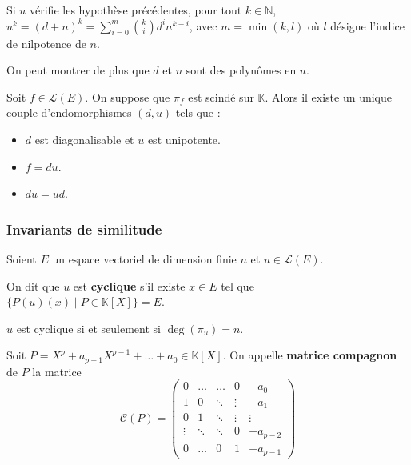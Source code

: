   \begin{corollary}
    Si $u$ vérifie les hypothèse précédentes, pour tout $k \in \mathbb{N}$, $u^k = (d + n)^k = \sum_{i=0}^m \binom{k}{i} d^i n^{k-i}$, avec $m = \min(k, l)$ où $l$ désigne l'indice de nilpotence de $n$.
  \end{corollary}

  \begin{remark}
    On peut montrer de plus que $d$ et $n$ sont des polynômes en $u$.
  \end{remark}


  \begin{theorem}
    Soit $f \in \mathcal{L}(E)$. On suppose que $\pi_f$ est scindé sur $\mathbb{K}$. Alors il existe un unique couple d'endomorphismes $(d, u)$ tels que :
    \begin{itemize}
      \item $d$ est diagonalisable et $u$ est unipotente.
      \item $f = du$.
      \item $du = ud$.
    \end{itemize}
  \end{theorem}

  \subsubsection{Invariants de similitude}


  Soient $E$ un espace vectoriel de dimension finie $n$ et $u \in \mathcal{L}(E)$.

  \begin{definition}
    On dit que $u$ est \textbf{cyclique} s'il existe $x \in E$ tel que $\{ P(u)(x) \mid P \in \mathbb{K}[X] \} = E$.
  \end{definition}

  \begin{proposition}
    $u$ est cyclique si et seulement si $\deg(\pi_u) = n$.
  \end{proposition}

  \begin{definition}
    Soit $P = X^p + a_{p-1} X^{p-1} + \dots + a_0 \in \mathbb{K}[X]$. On appelle \textbf{matrice compagnon} de $P$ la matrice
    \[ \mathcal{C}(P) = \begin{pmatrix} 0 & \dots & \dots & 0 & -a_0 \\ 1 & 0 & \ddots & \vdots & -a_1 \\ 0 & 1 & \ddots & \vdots & \vdots \\ \vdots & \ddots & \ddots & 0 & -a_{p-2} \\ 0 & \dots & 0 & 1 & -a_{p-1} \end{pmatrix} \]
  \end{definition}

